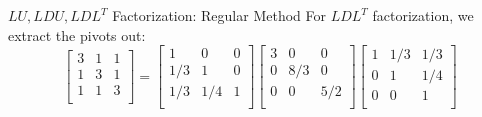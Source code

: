 \documentclass{beamer}
\begin{document}
\begin{frame}{$LU, LDU, LDL^T$ Factorization: Regular Method}
For $LDL^T$ factorization, we extract the pivots out:
\begin{equation*}
    \left[ \begin{matrix}
        3&		1&		1\\
        1&		3&		1\\
        1&		1&		3\\
    \end{matrix} \right]=\left[ \begin{matrix}
        1&		0&		0\\
        1/3&		1&		0\\
        1/3&		1/4&		1\\
    \end{matrix} \right]\left[ \begin{matrix}
        3&		0&		0\\
        0&		8/3&		0\\
        0&		0&		5/2\\
    \end{matrix} \right]\left[ \begin{matrix}
        1&		1/3&		1/3\\
        0&		1&		1/4\\
        0&		0&		1\\
    \end{matrix} \right]
\end{equation*}
\end{frame}
\end{document}
